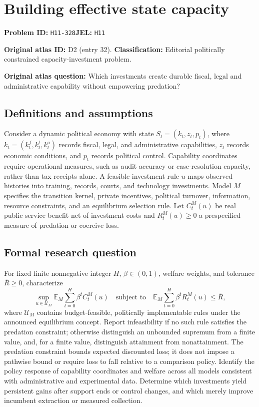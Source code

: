 \documentclass[11pt,a4paper]{article}
\begin{document}
\section*{Building effective state capacity}
\textbf{Problem ID:} \texttt{H11-328}\quad \textbf{JEL:} \texttt{H11}\par
\label{problem:OP-0032}
\label{atlas:prob:D2}
\noindent\textbf{Original atlas ID:} D2 (entry 32). \textbf{Classification:} Editorial politically constrained capacity-investment problem.

\noindent\textbf{Original atlas question:} Which investments create durable fiscal, legal and administrative capability without empowering predation?

\subsection*{Definitions and assumptions}
Consider a dynamic political economy with state $S_t=(k_t,z_t,p_t)$, where $k_t=(k_t^f,k_t^l,k_t^a)$ records fiscal, legal, and administrative capabilities, $z_t$ records economic conditions, and $p_t$ records political control. Capability coordinates require operational measures, such as audit accuracy or case-resolution capacity, rather than tax receipts alone. A feasible investment rule $u$ maps observed histories into training, records, courts, and technology investments. Model $M$ specifies the transition kernel, private incentives, political turnover, information, resource constraints, and an equilibrium selection rule. Let $C_t^M(u)$ be real public-service benefit net of investment costs and $R_t^M(u)\geq0$ a prespecified measure of predation or coercive loss.
\subsection*{Formal research question}
For fixed finite nonnegative integer $H$, $\beta\in(0,1)$, welfare weights, and tolerance $\bar R\geq0$, characterize
\[
 \sup_{u\in\mathcal U_M}
     \mathbb E_M\sum_{t=0}^H\beta^t C_t^M(u)
 \quad\text{subject to}\quad
     \mathbb E_M\sum_{t=0}^H\beta^t R_t^M(u)\leq\bar R,
\]
where $\mathcal U_M$ contains budget-feasible, politically implementable rules under the announced equilibrium concept. Report infeasibility if no such rule satisfies the predation constraint; otherwise distinguish an unbounded supremum from a finite value, and, for a finite value, distinguish attainment from nonattainment. The predation constraint bounds expected discounted loss; it does not impose a pathwise bound or require loss to fall relative to a comparison policy. Identify the policy response of capability coordinates and welfare across all models consistent with administrative and experimental data. Determine which investments yield persistent gains after support ends or control changes, and which merely improve incumbent extraction or measured collection.
\end{document}
